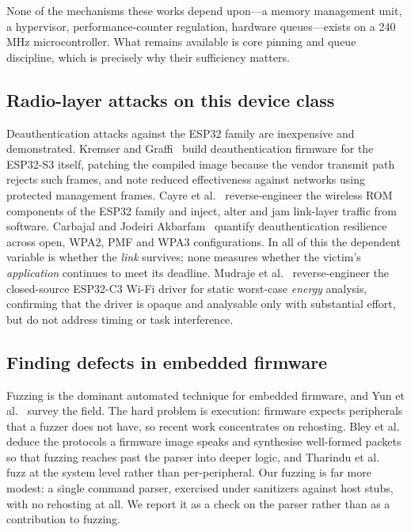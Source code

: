 None of the mechanisms these works depend upon---a memory management unit, a hypervisor,
performance-counter regulation, hardware queues---exists on a 240\,MHz microcontroller. What
remains available is core pinning and queue discipline, which is precisely why their sufficiency
matters.

\subsection{Radio-layer attacks on this device class}

Deauthentication attacks against the ESP32 family are inexpensive and demonstrated. Kremser and
Graffi~\cite{deauther2026} build deauthentication firmware for the ESP32-S3 itself, patching the
compiled image because the vendor transmit path rejects such frames, and note reduced
effectiveness against networks using protected management frames. Cayre
et al.~\cite{espwn2023} reverse-engineer the wireless ROM components of the ESP32 family and
inject, alter and jam link-layer traffic from software. Carbajal and Jodeiri
Akbarfam~\cite{carbajal2026} quantify deauthentication resilience across open, WPA2, PMF and WPA3
configurations. In all of this the dependent variable is whether the \emph{link} survives; none
measures whether the victim's \emph{application} continues to meet its deadline. Mudraje
et al.~\cite{esp32c3re2025} reverse-engineer the closed-source ESP32-C3 Wi-Fi driver for static
worst-case \emph{energy} analysis, confirming that the driver is opaque and analysable only with
substantial effort, but do not address timing or task interference.

\subsection{Finding defects in embedded firmware}

Fuzzing is the dominant automated technique for embedded firmware, and Yun et
al.~\cite{fuzzsurvey2022} survey the field. The hard problem is execution: firmware expects
peripherals that a fuzzer does not have, so recent work concentrates on rehosting. Bley et
al.~\cite{pemu2025} deduce the protocols a firmware image speaks and synthesise well-formed
packets so that fuzzing reaches past the parser into deeper logic, and Tharindu et
al.~\cite{sysfuss2026} fuzz at the system level rather than per-peripheral. Our fuzzing is far
more modest: a single command parser, exercised under sanitizers against host stubs, with no
rehosting at all. We report it as a check on the parser rather than as a contribution to
fuzzing.

